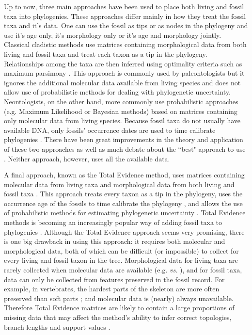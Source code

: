 \documentclass[12pt,letterpaper]{article}
\begin{document}
Up to now, three main approaches have been used to place both living and fossil taxa into phylogenies.
These approaches differ mainly in how they treat the fossil taxa and it's data. One can use the fossil as tips or as nodes in the phylogeny and use it's age only, it's morphology only or it's age and morphology jointly.
Classical cladistic methods use matrices containing morphological data from both living and fossil taxa and treat each taxon as a tip in the phylogeny. Relationships among the taxa are then inferred using optimality criteria such as maximum parsimony \citep{Hennig1966,felsenstein2004}.
This approach is commonly used by paleontologists but it ignores the additional molecular data available from living species and does not allow use of probabilistic methods for dealing with phylogenetic uncertainty.
Neontologists, on the other hand, more commonly use probabilistic approaches (e.g. Maximum Likelihood or Bayesian methods) based on matrices containing only molecular data from living species.
Because fossil taxa do not usually have available DNA, only fossils' occurrence dates are used to time calibrate phylogenies \citep{zuckerkandl1965}.
There have been great improvements in the theory and application of these two approaches \citep[e.g.][]{bapsta2013,stadlerdating2013,heaththe2013} as well as much debate about the ``best" approach to use \citep[e.g.][]{spencerefficacy2013,wrightbayesian2014}.
Neither approach, however, uses all the available data.

A final approach, known as the Total Evidence method, uses matrices containing molecular data from living taxa and morphological data from both living and fossil taxa \citep{eernissetaxonomic1993}.
This approach treats every taxon as a tip in the phylogeny, uses the occurrence age of the fossils to time calibrate the phylogeny \citep[known as tip-dating;][]{ronquista2012}, and allows the use of probabilistic methods for estimating phylogenetic uncertainty \citep{ronquista2012}.
Total Evidence methods is becoming an increasingly popular way of adding fossil taxa to phylogenies \citep[e.g.][]{pyrondivergence2011,ronquista2012,schragocombining2013,slaterphylogenetic2013,beckancient2014}.
Although the Total Evidence approach seems very promising, there is one big drawback in using this approach: it requires both molecular and morphological data, both of which can be difficult (or impossible) to collect for every living and fossil taxon in the tree.
Morphological data for living taxa are rarely collected when molecular data are available (e.g. \citealp{O'Leary08022013} \textit{vs.} \citealp{meredithimpacts2011}), and for fossil taxa, data can only be collected from features preserved in the fossil record.
For example, in vertebrates, the hardest parts of the skeleton are more often preserved than soft parts \citep{sansomfossilization2013}; and molecular data is (nearly) always unavailable.
Therefore Total Evidence matrices are likely to contain a large proportions of missing data that may affect the method's ability to infer correct topologies, branch lengths and support values \citep{salamin2003}. 
\end{document}
